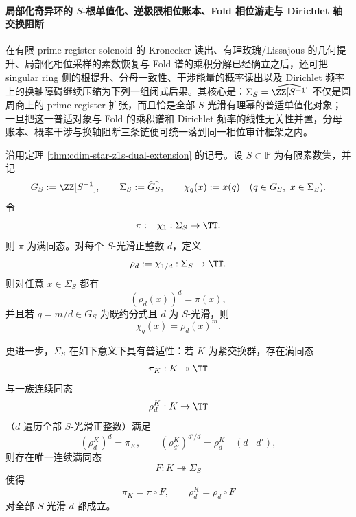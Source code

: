 \paragraph{局部化奇异环的 \(S\)-根单值化、逆极限相位账本、Fold 相位游走与 Dirichlet 轴交换阻断}
在有限 prime-register solenoid 的 Kronecker 读出、有理玫瑰/Lissajous 的几何提升、局部化相位采样的素数恢复与 Fold 谱的乘积分解已经确立之后，还可把 singular ring 侧的根提升、分母一致性、干涉能量的概率读出以及 Dirichlet 频率上的换轴障碍继续压缩为下列一组闭式后果。其核心是：\(\Sigma_S=\widehat{\ZZ[S^{-1}]}\) 不仅是圆周商上的 prime-register 扩张，而且恰是全部 \(S\)-光滑有理幂的普适单值化对象；一旦把这一普适对象与 Fold 的乘积谱和 Dirichlet 频率的线性无关性并置，分母账本、概率干涉与换轴阻断三条链便可统一落到同一相位审计框架之内。

\begin{theorem}\label{thm:xi-time-part65g-solenoid-s-root-universal-single-valuedization}
沿用定理 \ref{thm:cdim-star-z1s-dual-extension} 的记号。设 \(S\subset\mathbb P\) 为有限素数集，并记
\[
G_S:=\ZZ[S^{-1}],
\qquad
\Sigma_S:=\widehat{G_S},
\qquad
\chi_q(x):=x(q)
\quad (q\in G_S,\ x\in \Sigma_S).
\]
令
\[
\pi:=\chi_1:\Sigma_S\to \TT.
\]
则 \(\pi\) 为满同态。对每个 \(S\)-光滑正整数 \(d\)，定义
\[
\rho_d:=\chi_{1/d}:\Sigma_S\to \TT.
\]
则对任意 \(x\in \Sigma_S\) 都有
\[
(\rho_d(x))^d=\pi(x),
\]
并且若 \(q=m/d\in G_S\) 为既约分式且 \(d\) 为 \(S\)-光滑，则
\[
\chi_q(x)=\rho_d(x)^m.
\]

更进一步，\(\Sigma_S\) 在如下意义下具有普适性：若 \(K\) 为紧交换群，存在满同态
\[
\pi_K:K\twoheadrightarrow \TT
\]
与一族连续同态
\[
\rho_d^K:K\to \TT
\]
（\(d\) 遍历全部 \(S\)-光滑正整数）满足
\[
(\rho_d^K)^d=\pi_K,
\qquad
(\rho_{d'}^K)^{d'/d}=\rho_d^K
\quad (d\mid d'),
\]
则存在唯一连续满同态
\[
F:K\twoheadrightarrow \Sigma_S
\]
使得
\[
\pi_K=\pi\circ F,
\qquad
\rho_d^K=\rho_d\circ F
\]
对全部 \(S\)-光滑 \(d\) 都成立。
\end{theorem}
